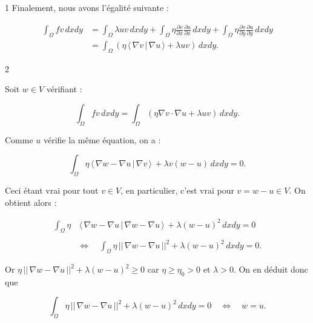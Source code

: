 \begin{reponse}{1}
Finalement, nous avons l'égalité suivante :

\begin{align*}
    \int_{\Omega} f v \, dxdy &= \int_{\Omega} \lambda u v \, dxdy + \int_{\Omega} \eta \frac{\partial v}{\partial x} \frac{\partial u}{\partial x} \, dxdy + \int_{\Omega} \eta \frac{\partial v}{\partial y} \frac{\partial u}{\partial y} \, dxdy \\
    &= \int_{\Omega} \left( \eta \, \langle \,\nabla v \, \vert \,  \nabla u \, \rangle + \lambda u v \right) \, dxdy.
\end{align*}

\end{reponse}


\begin{reponse}{2}

Soit $w \in V$ vérifiant :

\[
    \int_{\Omega} f v \, dxdy =\int_{\Omega} \left( \eta \nabla v \cdot \nabla u + \lambda u v \right) \, dxdy.
\]

Comme $u$ vérifie la même équation, on a :

\[
    \int_{\Omega} \eta \, \langle \, \nabla w - \nabla u \, \vert \, \nabla v \, \rangle \, + \lambda v(w-u) \, dxdy = 0.
\]

\newpage

Ceci étant vrai pour tout $v \in V$, en particulier, c'est vrai pour $v = w - u \in  V$. On obtient alors :

\begin{align*}
    \int_{\Omega} \eta & \, \langle \, \nabla w - \nabla u \, \vert \, \nabla w - \nabla u \, \rangle \, + \lambda (w-u)^2 \, dxdy = 0 \\ \\
    & \Longleftrightarrow  \quad \int_{\Omega} \eta \, \vert \vert \, \nabla w - \nabla u \, \vert \vert^2 + \lambda (w-u)^2 \, dxdy = 0.
\end{align*}

Or $\eta \,\vert \vert \, \nabla w - \nabla u \, \vert \vert^2 + \lambda (w-u)^2 \geq 0$ car $\eta \geq \eta_0 > 0$ et $\lambda >0$. On en déduit donc que 

\[
    \int_{\Omega} \eta \, \vert \vert \, \nabla w - \nabla u \, \vert \vert^2 + \lambda (w-u)^2 \, dxdy = 0 \quad \Longleftrightarrow \quad w=u.
\]

\end{reponse}

